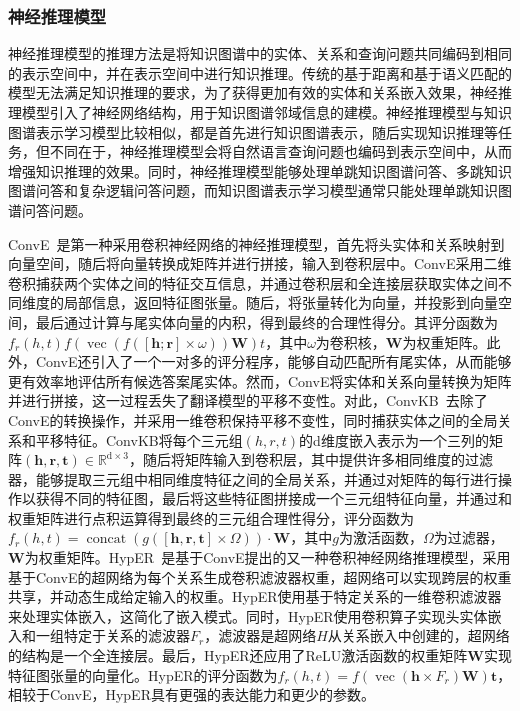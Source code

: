 \documentclass[algorithmlist, AutoFakeBold, AutoFakeSlant, figurelist, tablelist, nomlist, masters]{seuthesix}
\begin{document}
\subsubsection{神经推理模型}
神经推理模型的推理方法是将知识图谱中的实体、关系和查询问题共同编码到相同的表示空间中，并在表示空间中进行知识推理。传统的基于距离和基于语义匹配的模型无法满足知识推理的要求，为了获得更加有效的实体和关系嵌入效果，神经推理模型引入了神经网络结构，用于知识图谱邻域信息的建模。神经推理模型与知识图谱表示学习模型比较相似，都是首先进行知识图谱表示，随后实现知识推理等任务，但不同在于，神经推理模型会将自然语言查询问题也编码到表示空间中，从而增强知识推理的效果。同时，神经推理模型能够处理单跳知识图谱问答、多跳知识图谱问答和复杂逻辑问答问题，而知识图谱表示学习模型通常只能处理单跳知识图谱问答问题。

ConvE~\cite{dettmers2018convolutional}是第一种采用卷积神经网络的神经推理模型，首先将头实体和关系映射到向量空间，随后将向量转换成矩阵并进行拼接，输入到卷积层中。ConvE采用二维卷积捕获两个实体之间的特征交互信息，并通过卷积层和全连接层获取实体之间不同维度的局部信息，返回特征图张量。随后，将张量转化为向量，并投影到向量空间，最后通过计算与尾实体向量的内积，得到最终的合理性得分。其评分函数为$f_r\left(h, t\right)f(\operatorname{vec}(f([\bm{h} ; \bm{r}] \times \omega)) \mathbf{W}) t$，其中$\omega$为卷积核，$\mathbf{W}$为权重矩阵。此外，ConvE还引入了一个一对多的评分程序，能够自动匹配所有尾实体，从而能够更有效率地评估所有候选答案尾实体。然而，ConvE将实体和关系向量转换为矩阵并进行拼接，这一过程丢失了翻译模型的平移不变性。对此，ConvKB~\cite{nguyen2018novel}去除了ConvE的转换操作，并采用一维卷积保持平移不变性，同时捕获实体之间的全局关系和平移特征。ConvKB将每个三元组$\left(h, r, t\right)$的d维度嵌入表示为一个三列的矩阵$(\bm{h}, \bm{r}, \bm{t}) \in \mathbb{R}^{\mathrm{d} \times 3}$，随后将矩阵输入到卷积层，其中提供许多相同维度的过滤器，能够提取三元组中相同维度特征之间的全局关系，并通过对矩阵的每行进行操作以获得不同的特征图，最后将这些特征图拼接成一个三元组特征向量，并通过和权重矩阵进行点积运算得到最终的三元组合理性得分，评分函数为$f_r(h, t)=\operatorname{concat}(g([\bm{h}, \bm{r}, \bm{t}] \times \Omega)) \cdot \mathbf{W}$，其中$g$为激活函数，$\Omega$为过滤器，$\mathbf{W}$为权重矩阵。HypER~\cite{balazevic2019hypernetwork}是基于ConvE提出的又一种卷积神经网络推理模型，采用基于ConvE的超网络为每个关系生成卷积滤波器权重，超网络可以实现跨层的权重共享，并动态生成给定输入的权重。HypER使用基于特定关系的一维卷积滤波器来处理实体嵌入，这简化了嵌入模式。同时，HypER使用卷积算子实现头实体嵌入和一组特定于关系的滤波器$F_r$，滤波器是超网络$H$从关系嵌入中创建的，超网络的结构是一个全连接层。最后，HypER还应用了ReLU激活函数的权重矩阵$\mathbf{W}$实现特征图张量的向量化。HypER的评分函数为$f_r(h, t)=f\left(\operatorname{vec}\left(\bm{h} \times F_r\right) \mathbf{W}\right) \bm{t}$，相较于ConvE，HypER具有更强的表达能力和更少的参数。
\end{document}
